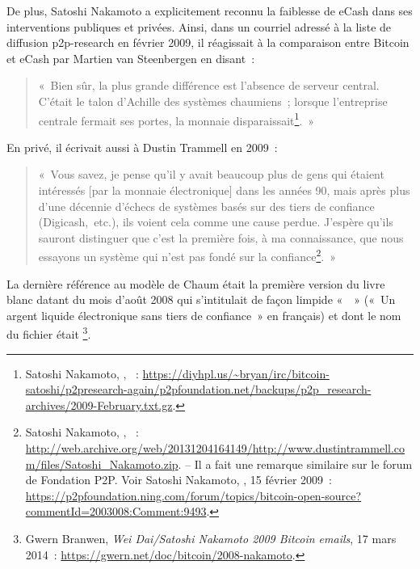 De plus, Satoshi Nakamoto a explicitement reconnu la faiblesse de eCash dans ses interventions publiques et privées. Ainsi, dans un courriel adressé à la liste de diffusion p2p-research en février 2009, il réagissait à la comparaison entre Bitcoin et eCash par Martien van Steenbergen en disant~:

\begin{quote}
«~Bien sûr, la plus grande différence est l'absence de serveur central. C'était le talon d'Achille des systèmes chaumiens~; lorsque l'entreprise centrale fermait ses portes, la monnaie disparaissait\footnote{Satoshi Nakamoto, , ~: \url{https://diyhpl.us/~bryan/irc/bitcoin-satoshi/p2presearch-again/p2pfoundation.net/backups/p2p_research-archives/2009-February.txt.gz}.}.~»
\end{quote} %

En privé, il écrivait aussi à Dustin Trammell en 2009~:

\begin{quote}
«~Vous savez, je pense qu'il y avait beaucoup plus de gens qui étaient intéressés [par la monnaie électronique] dans les années 90, mais après plus d'une décennie d'échecs de systèmes basés sur des tiers de confiance (Digicash,~etc.), ils voient cela comme une cause perdue. J'espère qu'ils sauront distinguer que c'est la première fois, à ma connaissance, que nous essayons un système qui n'est pas fondé sur la confiance\footnote{Satoshi Nakamoto, , ~: \url{http://web.archive.org/web/20131204164149/http://www.dustintrammell.com/files/Satoshi_Nakamoto.zip}. -- Il a fait une remarque similaire sur le forum de Fondation P2P. Voir Satoshi Nakamoto, , 15 février 2009~: \url{https://p2pfoundation.ning.com/forum/topics/bitcoin-open-source?commentId=2003008:Comment:9493}.}.~»
\end{quote}

La dernière référence au modèle de Chaum était la première version du livre blanc datant du mois d'août 2008 qui s'intitulait de façon limpide «~~» («~Un argent liquide électronique sans tiers de confiance~» en français) et dont le nom du fichier était \footnote{Gwern Branwen, \emph{Wei Dai/Satoshi Nakamoto 2009 Bitcoin emails}, 17 mars 2014~: \url{https://gwern.net/doc/bitcoin/2008-nakamoto}.}.

